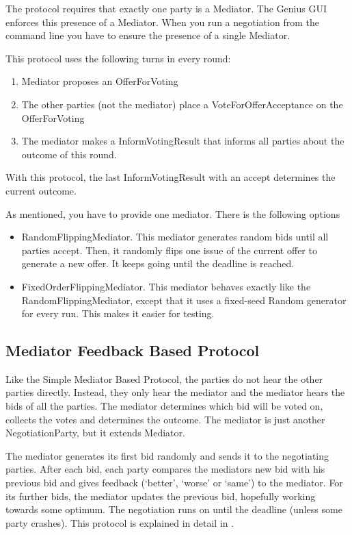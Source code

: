 \documentclass[]{article}
\newcommand*\vtick{\textsc{\char13}}
\newcommand\Genius{{\sc Genius}}
\begin{document}
The protocol requires that exactly one party is a Mediator. The {\Genius} GUI enforces this presence of a Mediator. When you run a negotiation from the command line you have to ensure the presence of a single Mediator.

This protocol uses the following turns in every round:
\begin{enumerate}
\item Mediator proposes an OfferForVoting
\item The other parties (not the mediator) place a VoteForOfferAcceptance on the OfferForVoting
\item The mediator makes a InformVotingResult that informs all parties about the outcome of this round.
\end{enumerate}

With this protocol, the last InformVotingResult with an accept determines the current outcome. 

As mentioned, you have to provide one mediator. There is the following options 
\begin{itemize}
\item RandomFlippingMediator.   This mediator generates random bids until all parties accept. Then, it
  randomly flips one issue of the current offer to generate a new offer. It
  keeps going until the deadline is reached. 
 \item FixedOrderFlippingMediator.   This mediator behaves exactly like the RandomFlippingMediator, except that it uses a fixed-seed Random generator for every run. This makes it easier for testing. 

\end{itemize}

\subsection{Mediator  Feedback Based Protocol}
Like the Simple Mediator Based Protocol, the parties do not hear the other parties directly. Instead, they only hear the mediator and the mediator hears the bids of all the parties. The mediator determines which bid will be voted on, collects the votes and determines the outcome. The mediator is just another NegotiationParty, but it extends Mediator.

 The mediator generates its first bid randomly and sends it to the negotiating parties. After each bid, each party compares the mediator\vtick s new bid with his previous bid and gives feedback (`better', `worse' or `same')  to the mediator. For its further bids, the mediator updates the previous bid, hopefully working towards some optimum. The negotiation runs on until the deadline (unless some party crashes). This protocol is explained in detail in \cite{MultiMediatedNegoProtocolsWithFeedback}.
\end{document}
